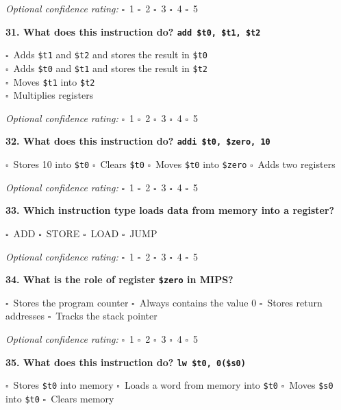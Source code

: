 \documentclass[12pt,a4paper]{article}
\newcommand{\boxmark}{\(\square\)}
\newcommand{\confidenceoptional}{%
    \textit{Optional confidence rating:} \boxmark\ 1 \hspace{1em} \boxmark\ 2 \hspace{1em} \boxmark\ 3 \hspace{1em} \boxmark\ 4 \hspace{1em} \boxmark\ 5
}
\begin{document}
\confidenceoptional

\textbf{31. What does this instruction do? \texttt{add \$t0, \$t1, \$t2}}

\boxmark\ Adds \texttt{\$t1} and \texttt{\$t2} and stores the result in \texttt{\$t0}\\
\boxmark\ Adds \texttt{\$t0} and \texttt{\$t1} and stores the result in \texttt{\$t2}\\
\boxmark\ Moves \texttt{\$t1} into \texttt{\$t2}\\
\boxmark\ Multiplies registers

\confidenceoptional

\textbf{32. What does this instruction do? \texttt{addi \$t0, \$zero, 10}}

\boxmark\ Stores 10 into \texttt{\$t0} \hspace{1em}
\boxmark\ Clears \texttt{\$t0} \hspace{1em}
\boxmark\ Moves \texttt{\$t0} into \texttt{\$zero} \hspace{1em}
\boxmark\ Adds two registers

\confidenceoptional

\textbf{33. Which instruction type loads data from memory into a register?}

\boxmark\ ADD \hspace{2em}
\boxmark\ STORE \hspace{2em}
\boxmark\ LOAD \hspace{2em}
\boxmark\ JUMP

\confidenceoptional

\textbf{34. What is the role of register \texttt{\$zero} in MIPS?}

\boxmark\ Stores the program counter \hspace{1em}
\boxmark\ Always contains the value 0 \hspace{1em}
\boxmark\ Stores return addresses \hspace{1em}
\boxmark\ Tracks the stack pointer

\confidenceoptional

\textbf{35. What does this instruction do? \texttt{lw \$t0, 0(\$s0)}}

\boxmark\ Stores \texttt{\$t0} into memory \hspace{1em}
\boxmark\ Loads a word from memory into \texttt{\$t0} \hspace{1em}
\boxmark\ Moves \texttt{\$s0} into \texttt{\$t0} \hspace{1em}
\boxmark\ Clears memory
\end{document}
